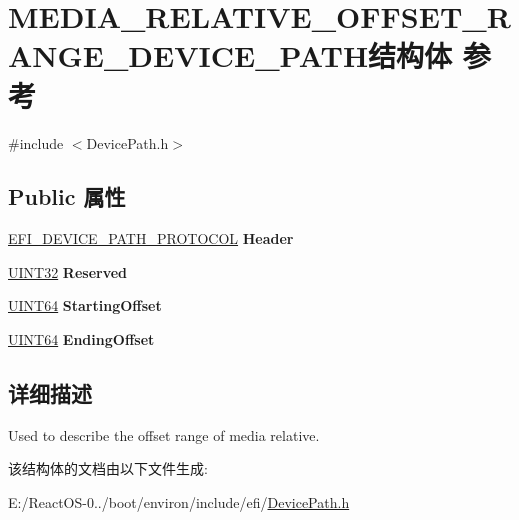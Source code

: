 \hypertarget{struct_m_e_d_i_a___r_e_l_a_t_i_v_e___o_f_f_s_e_t___r_a_n_g_e___d_e_v_i_c_e___p_a_t_h}{}\section{M\+E\+D\+I\+A\+\_\+\+R\+E\+L\+A\+T\+I\+V\+E\+\_\+\+O\+F\+F\+S\+E\+T\+\_\+\+R\+A\+N\+G\+E\+\_\+\+D\+E\+V\+I\+C\+E\+\_\+\+P\+A\+T\+H结构体 参考}
\label{struct_m_e_d_i_a___r_e_l_a_t_i_v_e___o_f_f_s_e_t___r_a_n_g_e___d_e_v_i_c_e___p_a_t_h}


{\ttfamily \#include $<$Device\+Path.\+h$>$}

\subsection*{Public 属性}
\begin{DoxyCompactItemize}
\item 
\mbox{\label{struct_m_e_d_i_a___r_e_l_a_t_i_v_e___o_f_f_s_e_t___r_a_n_g_e___d_e_v_i_c_e___p_a_t_h_a9d0d4a25bdf75951a2dc3c4478bbfbdd}} 
\hyperlink{struct_e_f_i___d_e_v_i_c_e___p_a_t_h___p_r_o_t_o_c_o_l}{E\+F\+I\+\_\+\+D\+E\+V\+I\+C\+E\+\_\+\+P\+A\+T\+H\+\_\+\+P\+R\+O\+T\+O\+C\+OL} {\bfseries Header}
\item 
\mbox{\label{struct_m_e_d_i_a___r_e_l_a_t_i_v_e___o_f_f_s_e_t___r_a_n_g_e___d_e_v_i_c_e___p_a_t_h_a5c0f78ca11592f599efca61d4cd4107d}} 
\hyperlink{_processor_bind_8h_ae1e6edbbc26d6fbc71a90190d0266018}{U\+I\+N\+T32} {\bfseries Reserved}
\item 
\mbox{\label{struct_m_e_d_i_a___r_e_l_a_t_i_v_e___o_f_f_s_e_t___r_a_n_g_e___d_e_v_i_c_e___p_a_t_h_a1f9b70cbcca6aa51985bd89ae4e22f06}} 
\hyperlink{_processor_bind_8h_a57be03562867144161c1bfee95ca8f7c}{U\+I\+N\+T64} {\bfseries Starting\+Offset}
\item 
\mbox{\label{struct_m_e_d_i_a___r_e_l_a_t_i_v_e___o_f_f_s_e_t___r_a_n_g_e___d_e_v_i_c_e___p_a_t_h_a7613ea1591190f596a7bed44e51aded4}} 
\hyperlink{_processor_bind_8h_a57be03562867144161c1bfee95ca8f7c}{U\+I\+N\+T64} {\bfseries Ending\+Offset}
\end{DoxyCompactItemize}


\subsection{详细描述}
Used to describe the offset range of media relative. 

该结构体的文档由以下文件生成\+:\begin{DoxyCompactItemize}
\item 
E\+:/\+React\+O\+S-\/0../boot/environ/include/efi/\hyperlink{_device_path_8h}{Device\+Path.\+h}\end{DoxyCompactItemize}
